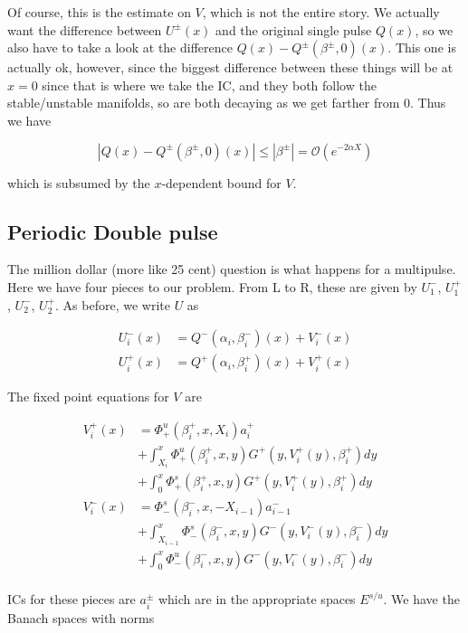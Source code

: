 \documentclass[12pt]{article}
\begin{document}
Of course, this is the estimate on $V$, which is not the entire story. We actually want the difference between $U^\pm(x)$ and the original single pulse $Q(x)$, so we also have to take a look at the difference $Q(x) - Q^\pm(\beta^\pm, 0)(x)$. This one is actually ok, however, since the biggest difference between these things will be at $x = 0$ since that is where we take the IC, and they both follow the stable/unstable manifolds, so are both decaying as we get farther from 0. Thus we have

\[
|Q(x) - Q^\pm(\beta^\pm, 0)(x)| \leq |\beta^\pm| = \mathcal{O}(e^{-2 \alpha X})
\]

which is subsumed by the $x$-dependent bound for $V$.\\

\subsection*{Periodic Double pulse}

The million dollar (more like 25 cent) question is what happens for a multipulse. Here we have four pieces to our problem. From L to R, these are given by
$U_1^-$, $U_1^+$, $U_2^-$, $U_2^+$. As before, we write $U$ as

\begin{align*}
U_i^-(x) &= Q^-(\alpha_i, \beta_i^-)(x) + V_i^-(x) \\
U_i^+(x) &= Q^+(\alpha_i, \beta_i^+)(x) + V_i^+(x)
\end{align*}

The fixed point equations for $V$ are

\begin{align*}
V_i^+(x) &= \Phi^u_+(\beta_i^+, x, X_i) a_i^+ \\
&+ \int_{X_i}^x \Phi_+^u(\beta_i^+, x, y) G^+(y, V_i^+(y),\beta_i^+)dy \\
&+ \int_0^x \Phi_+^s(\beta_i^+, x, y) G^+(y, V_i^+(y),\beta_i^+)dy \\ 
V_i^-(x) &= \Phi^s_-(\beta_i^-, x, -X_{i-1}) a_{i-1}^- \\
&+ \int_{X_{i-1}}^x \Phi_-^s(\beta_i^-, x, y) G^-(y, V_i^-(y),\beta_i^-)dy \\
&+ \int_0^x \Phi_-^u(\beta_i^-, x, y) G^-(y, V_i^-(y),\beta_i^-)dy \\
\end{align*}

ICs for these pieces are $a_i^\pm$ which are in the appropriate spaces $E^{s/u}$. We have the Banach spaces with norms
\end{document}

